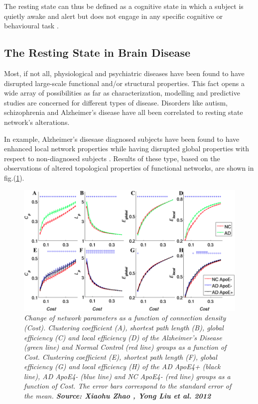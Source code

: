 \documentclass[12pt,openright,twoside,a4paper]{book}
\begin{document}
The resting state can thus be defined as a cognitive state in which a subject is quietly awake and alert but does not engage in any specific cognitive or behavioural task \cite{Rest-NTW}.

\clearpage

\subsection{The Resting State in Brain Disease}

Most, if not all, physiological and psychiatric diseases have been found to have disrupted large-scale functional and/or structural properties.
This fact opens a wide array of possibilities as far as characterization, modelling and predictive studies are concerned for different types of disease.
Disorders like autism, schizophrenia and Alzheimer's disease have all been correlated to resting state network's alterations.

In example, Alzheimer's disesase diagnosed subjects have been found to have enhanced local network properties while having disrupted global properties with respect to non-diagnosed subjects \cite{ssa}.
Results of these type, based on the observations of altered topological properties of functional networks, are shown in fig.(\ref{ssa}).

\begin{figure}[!h]
\centering
\includegraphics[scale=0.45]{ssa}
\caption{\textit{Change of network parameters as a function of connection density (Cost). Clustering coefficient (A), shortest path length (B), global efficiency (C) and local efficiency (D) of the Alzheimer's Disease (green line) and Normal Control (red line) groups as a function of Cost. Clustering coefficient (E), shortest path length (F), global efficiency (G) and local efficiency (H) of the AD ApoE4+ (black line), AD ApoE4- (blue line) and NC ApoE4- (red line) groups as a function of Cost. The error bars correspond to the standard error of the mean. \textbf{Source: Xiaohu Zhao , Yong Liu et al. 2012 \cite{ssa}}}}
\label{ssa}
\end{figure}
\end{document}
